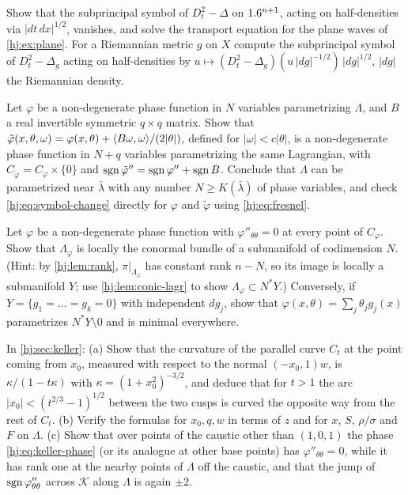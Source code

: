 \begin{exercise}\label{hj:ex:subprincipal-wave}
  Show that the subprincipal symbol of $D_t^2-\Delta$ on $1.6^{n+1}$, acting on
  half-densities via $|dt\,dx|^{1/2}$, vanishes, and solve the transport equation
  for the plane waves of \cref{hj:ex:plane}.  For a Riemannian metric $g$ on $X$
  compute the subprincipal symbol of $D_t^2-\Delta_g$ acting on half-densities by
  $u\mapsto(D_t^2-\Delta_g)(u\,|dg|^{-1/2})\,|dg|^{1/2}$, $|dg|$ the Riemannian
  density.
\end{exercise}

\begin{exercise}\label{hj:ex:add-variables}
  Let $\varphi$ be a non-degenerate phase function in $N$ variables
  parametrizing $\Lambda$, and $B$ a real invertible symmetric $q\times q$
  matrix.  Show that $\tilde\varphi(x,\theta,\omega)=\varphi(x,\theta)+
  \langle B\omega,\omega\rangle/(2|\theta|)$, defined for $|\omega|<c|\theta|$, is a
  non-degenerate phase function in $N+q$ variables parametrizing the same
  Lagrangian, with $C_{\tilde\varphi}=C_\varphi\times\{0\}$ and
  $\operatorname{sgn}\tilde\varphi''=\operatorname{sgn}\varphi''+\operatorname{sgn} B$.  Conclude that $\Lambda$ can be
  parametrized near $\bar\lambda$ with any number $N\ge K(\bar\lambda)$ of phase
  variables, and check \eqref{hj:eq:symbol-change} directly for $\varphi$ and
  $\tilde\varphi$ using \eqref{hj:eq:fresnel}.
\end{exercise}

\begin{exercise}\label{hj:ex:constant-rank}
  Let $\varphi$ be a non-degenerate phase function with
  $\varphi''_{\theta\theta}=0$ at every point of $C_\varphi$.  Show that
  $\Lambda_\varphi$ is locally the conormal bundle of a submanifold of
  codimension $N$.  (Hint: by \cref{hj:lem:rank}, $\pi|_{\Lambda_\varphi}$ has
  constant rank $n-N$, so its image is locally a submanifold $Y$; use
  \cref{hj:lem:conic-lagr} to show $\Lambda_\varphi\subset N^*Y$.)  Conversely,
  if $Y=\{g_1=\dots=g_k=0\}$ with independent $dg_j$, show that
  $\varphi(x,\theta)=\sum_j\theta_jg_j(x)$ parametrizes $N^*Y\setminus0$ and
  is minimal everywhere.
\end{exercise}

\begin{exercise}\label{hj:ex:keller}
  In \cref{hj:sec:keller}: (a) Show that the curvature of the parallel curve
  $C_t$ at the point coming from $x_0$, measured with respect to the normal
  $(-x_0,1)w$, is $\kappa/(1-t\kappa)$ with $\kappa=(1+x_0^2)^{-3/2}$, and deduce
  that for $t>1$ the arc $|x_0|<(t^{2/3}-1)^{1/2}$ between the two cusps is curved
  the opposite way from the rest of $C_t$.  (b) Verify the formulas for $x_0,q,w$
  in terms of $z$ and for $x$, $S$, $\rho/\sigma$ and $F$ on $\Lambda$.
  (c) Show that over points of the caustic other than $(1,0,1)$ the phase
  \eqref{hj:eq:keller-phase} (or its analogue at other base points) has
  $\varphi''_{\theta\theta}=0$, while it has rank one at the nearby points of
  $\Lambda$ off the caustic, and that the jump of
  $\operatorname{sgn}\varphi''_{\theta\theta}$ across $\mathcal K$ along $\Lambda$ is again
  $\pm2$.
\end{exercise}

